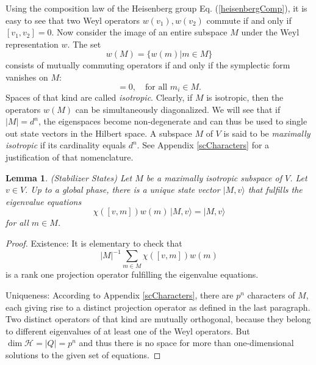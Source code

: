 \documentclass[aps,twocolumn,floatfix]{revtex4}
\newtheorem{lemma}[theorem]{Lemma}
\def\ket#1.{|#1\rangle}
\def\H{\mathcal{H}}
\begin{document}
Using the composition law of the Heisenberg group Eq.
(\ref{heisenbergComp}), it is easy to see that two Weyl operators
$w(v_1), w(v_2)$ commute if and only if $[v_1, v_2]=0$. Now consider
the image of an entire subspace $M$ under the Weyl representation $w$. 
The set 
\begin{equation*}
	w(M)=\{w(m)|m\in M\}
\end{equation*}
consists of mutually commuting operators if and only if the symplectic
form vanishes on $M$:
\begin{equation*}
	[m_1,m_2]=0, \quad \text{for all }m_i\in M.
\end{equation*}
Spaces of that kind are called \emph{isotropic}.  Clearly, if $M$ is
isotropic, then the operators $w(M)$ can be simultaneously
diagonalized. We will see that if $|M|=d^n$, the eigenspaces become
non-degenerate and can thus be used to single out state vectors in the
Hilbert space. A subspace $M$ of $V$ is said to be \emph{maximally
isotropic} if its cardinality equals $d^n$.  See Appendix
\ref{scCharacters} for a justification of that nomenclature.

\begin{lemma}\label{lmStabilizers}
	\emph{(Stabilizer States)}
	Let $M$ be a maximally isotropic subspace of $V$. Let $v \in V$.
	Up to a global phase, there is a unique state vector $\ket M, v.$
	that fulfills the eigenvalue equations
	\begin{equation*}
		\chi([v,m])w(m) \,\ket M, v. = \ket M, v.
	\end{equation*}
	for all $m\in M$.
\end{lemma}

\begin{proof}
	Existence:
		It is elementary to check that
		\begin{equation}\label{stabProjector}
			|M|^{-1} \sum_{m\in M} \chi([v,m]) w(m)
		\end{equation}
		is a rank one projection operator fulfilling the eigenvalue
		equations.

	Uniqueness:
		According to Appendix \ref{scCharacters}, there are $p^n$
		characters of $M$, each giving rise to a distinct projection
		operator as defined in the last paragraph. Two distinct operators
		of that kind are mutually orthogonal, because they belong to
		different eigenvalues of at least one of the Weyl operators.  But
		$\dim\H=|Q|=p^n$ and thus there is no space for more than
		one-dimensional solutions to the given set of equations.
\end{proof}
\end{document}
